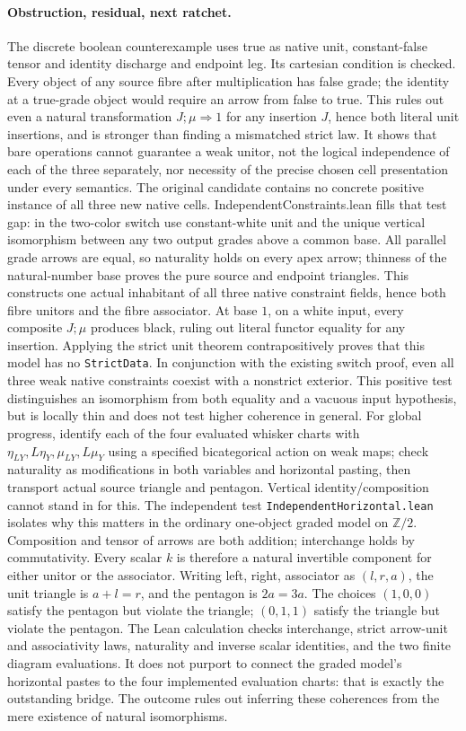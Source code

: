 \documentclass{article}
\begin{document}
\paragraph{Obstruction, residual, next ratchet.}
The discrete boolean counterexample uses true as native unit, constant-false tensor and identity discharge and endpoint leg. Its cartesian condition is checked. Every object of any source fibre after multiplication has false grade; the identity at a true-grade object would require an arrow from false to true. This rules out even a natural transformation $J;\mu\Rightarrow1$ for any insertion $J$, hence both literal unit insertions, and is stronger than finding a mismatched strict law. It shows that bare operations cannot guarantee a weak unitor, not the logical independence of each of the three separately, nor necessity of the precise chosen cell presentation under every semantics. The original candidate contains no concrete positive instance of all three new native cells. IndependentConstraints.lean fills that test gap: in the two-color switch use constant-white unit and the unique vertical isomorphism between any two output grades above a common base. All parallel grade arrows are equal, so naturality holds on every apex arrow; thinness of the natural-number base proves the pure source and endpoint triangles. This constructs one actual inhabitant of all three native constraint fields, hence both fibre unitors and the fibre associator. At base $1$, on a white input, every composite $J;\mu$ produces black, ruling out literal functor equality for any insertion. Applying the strict unit theorem contrapositively proves that this model has no \texttt{StrictData}. In conjunction with the existing switch proof, even all three weak native constraints coexist with a nonstrict exterior. This positive test distinguishes an isomorphism from both equality and a vacuous input hypothesis, but is locally thin and does not test higher coherence in general. For global progress, identify each of the four evaluated whisker charts with $\eta_{LY},L\eta_Y,\mu_{LY},L\mu_Y$ using a specified bicategorical action on weak maps; check naturality as modifications in both variables and horizontal pasting, then transport actual source triangle and pentagon. Vertical identity/composition cannot stand in for this. The independent test \texttt{IndependentHorizontal.lean} isolates why this matters in the ordinary one-object graded model on $\mathbb Z/2$. Composition and tensor of arrows are both addition; interchange holds by commutativity. Every scalar $k$ is therefore a natural invertible component for either unitor or the associator. Writing left, right, associator as $(l,r,a)$, the unit triangle is $a+l=r$, and the pentagon is $2a=3a$. The choices $(1,0,0)$ satisfy the pentagon but violate the triangle; $(0,1,1)$ satisfy the triangle but violate the pentagon. The Lean calculation checks interchange, strict arrow-unit and associativity laws, naturality and inverse scalar identities, and the two finite diagram evaluations. It does not purport to connect the graded model's horizontal pastes to the four implemented evaluation charts: that is exactly the outstanding bridge. The outcome rules out inferring these coherences from the mere existence of natural isomorphisms.
\end{document}
